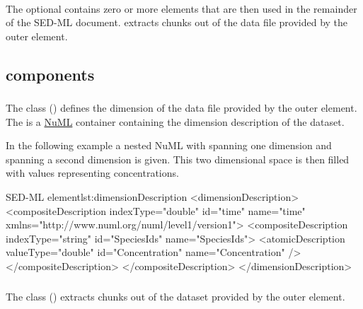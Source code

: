 \paragraph*{}
\label{sec:listOfDataSources}
The optional  contains zero or more \SedDataSource elements that are then used in the remainder of the SED-ML document. \SedDataSource extracts chunks out of the data file provided by the outer \SedDataDescription element. 

\subsection{ components}
\label{class:dataDescriptionComponents}


\subsubsection{}
\label{class:dimensionDescription}
The  class () defines the dimension of the data file provided by the outer \SedDataDescription element. The  is a \hyperref[sec:numl]{NuML} container containing the dimension description of the dataset.

In the following example a nested NuML  with  spanning one dimension and  spanning a second dimension is given. This two dimensional space is then filled with  values representing concentrations.

\begin{myXmlLst}{SED-ML  element}{lst:dimensionDescription}
<dimensionDescription>
	<compositeDescription indexType="double" id="time" name="time" 
		xmlns="http://www.numl.org/numl/level1/version1">
		<compositeDescription indexType="string" id="SpeciesIds" name="SpeciesIds">
			<atomicDescription valueType="double" id="Concentration" name="Concentration" />
		</compositeDescription>
	</compositeDescription>
</dimensionDescription>
\end{myXmlLst} 

\subsubsection{}
\label{class:dataSource}
The  class () extracts chunks out of the dataset provided by the outer \SedDataDescription element.

